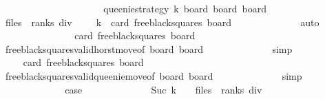 \begin{isabellebody}
\ \ \ \ \ \ \ \ \isamarkupfalse%
\isanewline
\ \ \ \ \ \ \ \ \ \ \isamarkupfalse%
\ {\isacharparenleft}{}\ queenie{\isacharunderscore}strategy\ k\ board\ board{\isacharprime}\ board{\isacharprime}{\isacharprime}{\isacharparenright}\isanewline
\ \ \ \ \ \ \ \ \ \ \isamarkupfalse%
\ {\isachardoublequoteopen}{\isacharparenleft}files\ {\isacharasterisk}\ ranks{\isacharparenright}\ div\ {}\ {\isacharminus}\ {}\ {\isacharasterisk}\ k\ {\isasymle}\ card\ {\isacharparenleft}free{\isacharunderscore}black{\isacharunderscore}squares\ board{\isacharparenright}{\isachardoublequoteclose}\isanewline
\ \ \ \ \ \ \ \ \ \ \ \ \isamarkupfalse%
\ auto\isanewline
\ \ \ \ \ \ \ \ \ \ \isamarkupfalse%
\ \isamarkupfalse%
\ {\isachardoublequoteopen}{\isachardot}{\isachardot}{\isachardot}\ {\isasymle}\ card\ {\isacharparenleft}free{\isacharunderscore}black{\isacharunderscore}squares\ board{\isacharprime}{\isacharparenright}\ {\isacharplus}\ {}{\isachardoublequoteclose}\isanewline
\ \ \ \ \ \ \ \ \ \ \ \ \isamarkupfalse%
\ {}\isanewline
\ \ \ \ \ \ \ \ \ \ \ \ \isamarkupfalse%
\ free{\isacharunderscore}black{\isacharunderscore}squares{\isacharunderscore}valid{\isacharunderscore}horst{\isacharunderscore}move{\isacharbrackleft}of\ board\ board{\isacharprime}{\isacharbrackright}\isanewline
\ \ \ \ \ \ \ \ \ \ \ \ \isamarkupfalse%
\ simp\isanewline
\ \ \ \ \ \ \ \ \ \ \isamarkupfalse%
\ \isamarkupfalse%
\ {\isachardoublequoteopen}{\isachardot}{\isachardot}{\isachardot}\ {\isasymle}\ card\ {\isacharparenleft}free{\isacharunderscore}black{\isacharunderscore}squares\ board{\isacharprime}{\isacharprime}{\isacharparenright}\ {\isacharplus}\ {}{\isachardoublequoteclose}\isanewline
\ \ \ \ \ \ \ \ \ \ \ \ \isamarkupfalse%
\ {}\isanewline
\ \ \ \ \ \ \ \ \ \ \ \ \isamarkupfalse%
\ free{\isacharunderscore}black{\isacharunderscore}squares{\isacharunderscore}valid{\isacharunderscore}queenie{\isacharunderscore}move{\isacharbrackleft}of\ board{\isacharprime}\ board{\isacharprime}{\isacharprime}{\isacharbrackright}\isanewline
\ \ \ \ \ \ \ \ \ \ \ \ \isamarkupfalse%
\ simp\isanewline
\ \ \ \ \ \ \ \ \ \ \isamarkupfalse%
\ \isamarkupfalse%
\ {\isacharquery}case\isanewline
\ \ \ \ \ \ \ \ \ \ \ \ \isamarkupfalse%
\ {\isacharbackquoteopen}Suc\ {\isacharparenleft}k\ {\isacharplus}\ {}{\isacharparenright}\ {\isasymle}\ {\isacharparenleft}files\ {\isacharasterisk}\ ranks{\isacharparenright}\ div\ {}{\isacharbackquoteclose}\isanewline

\end{isabellebody}
